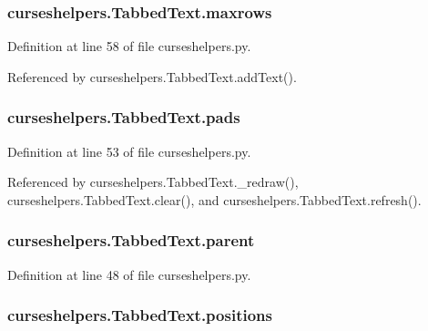 \subsubsection[{maxrows}]{\setlength{\rightskip}{0pt plus 5cm}curseshelpers.\-Tabbed\-Text.\-maxrows}\label{classcurseshelpers_1_1TabbedText_a2edaa23ac8df49ba00cd1d2a019cf4c9}


Definition at line 58 of file curseshelpers.\-py.



Referenced by curseshelpers.\-Tabbed\-Text.\-add\-Text().

\subsubsection[{pads}]{\setlength{\rightskip}{0pt plus 5cm}curseshelpers.\-Tabbed\-Text.\-pads}\label{classcurseshelpers_1_1TabbedText_a030191d2d02c0688144699d6ae68f604}


Definition at line 53 of file curseshelpers.\-py.



Referenced by curseshelpers.\-Tabbed\-Text.\-\_\-redraw(), curseshelpers.\-Tabbed\-Text.\-clear(), and curseshelpers.\-Tabbed\-Text.\-refresh().

\subsubsection[{parent}]{\setlength{\rightskip}{0pt plus 5cm}curseshelpers.\-Tabbed\-Text.\-parent}\label{classcurseshelpers_1_1TabbedText_ae734a2a09a601a030ab7fed8f90f05da}


Definition at line 48 of file curseshelpers.\-py.

\subsubsection[{positions}]{\setlength{\rightskip}{0pt plus 5cm}curseshelpers.\-Tabbed\-Text.\-positions}\label{classcurseshelpers_1_1TabbedText_ab0791883abbe6bab53eb5b16213a7cdb}


